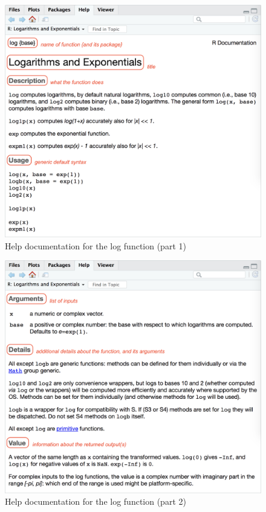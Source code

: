 \documentclass[
]{book}
\begin{document}
\begin{figure}

{\centering \includegraphics[width=0.85\linewidth]{images/rstudio/help-log-1} 

}

\caption{Help documentation for the log function (part 1)}\label{fig:unnamed-chunk-22}
\end{figure}

\begin{figure}

{\centering \includegraphics[width=0.85\linewidth]{images/rstudio/help-log-2} 

}

\caption{Help documentation for the log function (part 2)}\label{fig:unnamed-chunk-23}
\end{figure}
\end{document}
